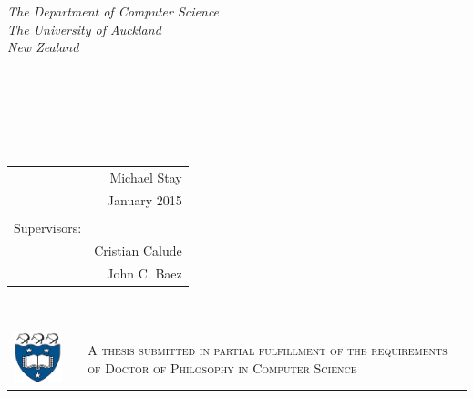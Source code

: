 \documentclass[12pt,twoside,openright]{report}
\begin{document}
  \thispagestyle{empty}
  \begin{center}
    {\em The Department of Computer Science \\ The University of Auckland \\ New Zealand \\[240pt]}
    \\
    \\~\\
    \\
  \end{center}
  {\hfill \em \fontsize{16}{16}\selectfont
    \begin{tabular}{rr}
      & Michael Stay \\
      & January 2015 \\ & \\
      Supervisors: & \\
      & Cristian Calude\\
      & John C. Baez \\
    \end{tabular}
  }\\
  \begin{tabular}{cp{50pt}p{300pt}}
    \includegraphics[width=75pt]{shield.eps} & &
    \vspace{-50pt} \textsc{\fontsize{16}{16}\selectfont A thesis submitted in partial fulfillment of the requirements of Doctor of Philosophy in Computer Science}
  \end{tabular}\\
  \pagebreak
  
\renewcommand{\thepage}{\roman{page}}
\end{document}
